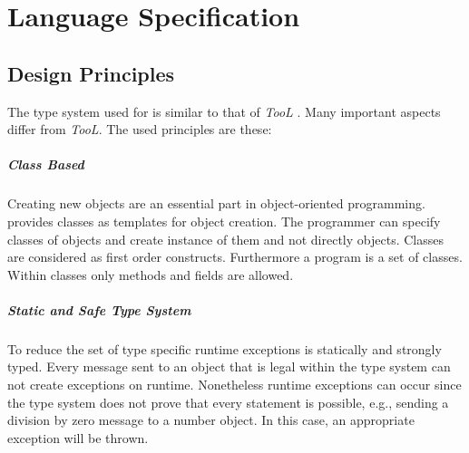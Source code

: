 \chapter{Language Specification}


\section{Design Principles}
The type system used for \ooplss is similar to that of \emph{TooL}
\cite{gawecki_tool:_1995}. Many important aspects differ from
\emph{TooL}. The used principles are these:


\paragraph{Class Based}
Creating new objects are an essential part in object-oriented
programming. \ooplss provides classes as templates for object
creation. The programmer can specify classes of objects and create
instance of them and not directly objects. Classes are considered as
first order constructs. Furthermore a program is a set of classes. Within
classes only methods and fields are allowed.

\paragraph{Static and Safe Type System}
To reduce the set of type specific runtime exceptions \ooplss is statically
and strongly typed. Every message sent to an object that is legal within
the type system can not create exceptions on runtime. Nonetheless runtime
exceptions can occur since the type system does not prove that every
statement is possible, e.g., sending a division by zero message to a
number object.  In this case, an appropriate exception will be thrown.


